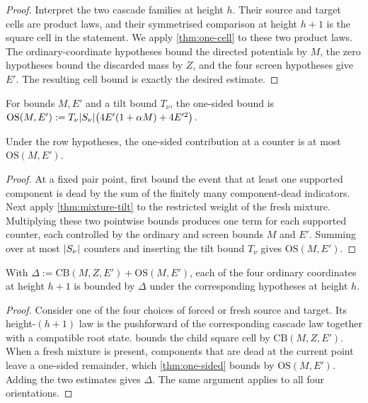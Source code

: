 \begin{proof}
\leanok
{}
Interpret the two cascade families at height $h$. Their source and target cells are product laws,
and their symmetrised comparison at height $h+1$ is the square cell in the statement. We apply
\cref{thm:one-cell} to these two product laws. The ordinary-coordinate hypotheses bound the
directed potentials by $M$, the zero hypotheses bound the discarded mass by $Z$, and the four
screen hypotheses give $E'$. The resulting cell bound is exactly the desired estimate.
\end{proof}

\begin{definition}
\label{def:oneSided}
\leanok
For bounds $M,E'$ and a tilt bound $T_\nu$, the one-sided bound is
$\mathrm{OS}(M,E'):=T_\nu\lvert S_\nu \rvert\bigl(4E'(1+\alpha M)+4E'^2\bigr)$.
\end{definition}

\begin{lemma}
\label{thm:one-sided}
\leanok
{}
Under the row hypotheses, the one-sided contribution at a counter is at most
$\mathrm{OS}(M,E')$.
\end{lemma}

\begin{proof}
\leanok
{}
At a fixed pair point, first bound the event that at least one supported component is dead by the
sum of the finitely many component-dead indicators. Next apply \cref{thm:mixture-tilt} to the
restricted weight of the fresh mixture. Multiplying these two pointwise bounds produces one term
for each supported counter, each controlled by the ordinary and screen bounds $M$ and $E'$.
Summing over at most $\lvert S_\nu \rvert$ counters and inserting the tilt bound $T_\nu$ gives
$\mathrm{OS}(M,E')$.
\end{proof}

\begin{lemma}
\label{thm:psi-rows}
\leanok
{}
With $\Delta:=\mathrm{CB}(M,Z,E')+\mathrm{OS}(M,E')$, each of the four ordinary coordinates at
height $h+1$ is bounded by $\Delta$ under the corresponding hypotheses at height $h$.
\end{lemma}

\begin{proof}
\leanok
{}
Consider one of the four choices of forced or fresh source and target. Its height-$(h+1)$ law is
the pushforward of the corresponding cascade law together with a compatible root state.
 bounds the child square cell by $\mathrm{CB}(M,Z,E')$. When a fresh
mixture is present, components that are dead at the current point leave a one-sided remainder,
which \cref{thm:one-sided} bounds by $\mathrm{OS}(M,E')$. Adding the two estimates gives
$\Delta$. The same argument applies to all four orientations.
\end{proof}

